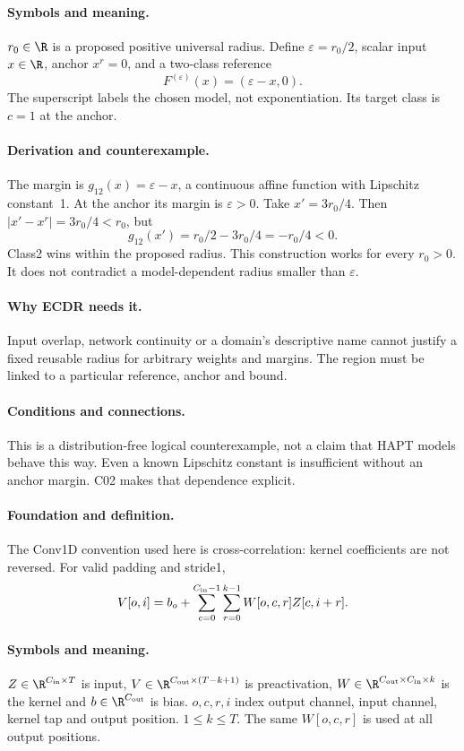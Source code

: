 \paragraph{Symbols and meaning.}
$r_0\in\R$ is a proposed positive universal radius. Define
$\varepsilon=r_0/2$, scalar input $x\in\R$, anchor $x^r=0$, and a
two-class reference
\[
 F^{(\varepsilon)}(x)=(\varepsilon-x,0).
\]
The superscript labels the chosen model, not exponentiation. Its target
class is $c=1$ at the anchor.
\paragraph{Derivation and counterexample.}
The margin is $g_{12}(x)=\varepsilon-x$, a continuous affine function
with Lipschitz constant~1. At the anchor its margin is $\varepsilon>0$.
Take $x'=3r_0/4$. Then $|x'-x^r|=3r_0/4<r_0$, but
\[
 g_{12}(x')=r_0/2-3r_0/4=-r_0/4<0.
\]
Class2 wins within the proposed radius. This construction works for every
$r_0>0$. It does not contradict a model-dependent radius smaller than
$\varepsilon$.
\paragraph{Why ECDR needs it.}
Input overlap, network continuity or a domain's descriptive name cannot
justify a fixed reusable radius for arbitrary weights and margins.
The region must be linked to a particular reference, anchor and bound.
\paragraph{Conditions and connections.}
This is a distribution-free logical counterexample, not a claim that HAPT
models behave this way. Even a known Lipschitz constant is insufficient
without an anchor margin. C02 makes that dependence explicit.

\paragraph{Foundation and definition.}
The Conv1D convention used here is cross-correlation: kernel coefficients
are not reversed. For valid padding and stride1,
\[
 V[o,i]=b_o+\sum_{c=0}^{C_{\rm in}-1}\sum_{r=0}^{k-1}
 W[o,c,r]Z[c,i+r].
\]
\paragraph{Symbols and meaning.}
$Z\in\R^{C_{\rm in}\times T}$ is input, $V\in\R^{C_{\rm out}\times(T-k+1)}$
is preactivation, $W\in\R^{C_{\rm out}\times C_{\rm in}\times k}$ is
the kernel and $b\in\R^{C_{\rm out}}$ is bias. $o,c,r,i$ index output
channel, input channel, kernel tap and output position. $1\le k\le T$.
The same $W[o,c,r]$ is used at all output positions.
